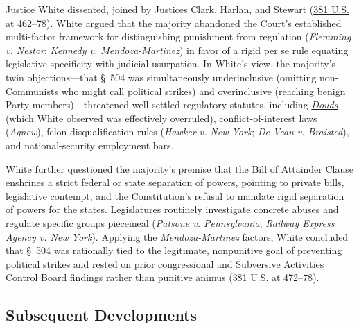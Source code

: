 \documentclass[12pt]{article}
\begin{document}
Justice White dissented, joined by Justices Clark, Harlan, and Stewart (\href{https://supreme.justia.com/cases/federal/us/381/437/}{381 U.S. at 462--78}). White argued that the majority abandoned the Court's established multi-factor framework for distinguishing punishment from regulation (\textit{Flemming v. Nestor}; \textit{Kennedy v. Mendoza-Martinez}) in favor of a rigid per se rule equating legislative specificity with judicial usurpation. In White's view, the majority's twin objections---that \S~504 was simultaneously underinclusive (omitting non-Communists who might call political strikes) and overinclusive (reaching benign Party members)---threatened well-settled regulatory statutes, including \href{https://supreme.justia.com/cases/federal/us/339/382/}{\textit{Douds}} (which White observed was effectively overruled), conflict-of-interest laws (\textit{Agnew}), felon-disqualification rules (\textit{Hawker v. New York}; \textit{De Veau v. Braisted}), and national-security employment bars.

White further questioned the majority's premise that the Bill of Attainder Clause enshrines a strict federal or state separation of powers, pointing to private bills, legislative contempt, and the Constitution's refusal to mandate rigid separation of powers for the states. Legislatures routinely investigate concrete abuses and regulate specific groups piecemeal (\textit{Patsone v. Pennsylvania}; \textit{Railway Express Agency v. New York}). Applying the \textit{Mendoza-Martinez} factors, White concluded that \S~504 was rationally tied to the legitimate, nonpunitive goal of preventing political strikes and rested on prior congressional and Subversive Activities Control Board findings rather than punitive animus (\href{https://www.law.cornell.edu/supremecourt/text/381/437}{381 U.S. at 472--78}).

\subsection{Subsequent Developments}
\end{document}
